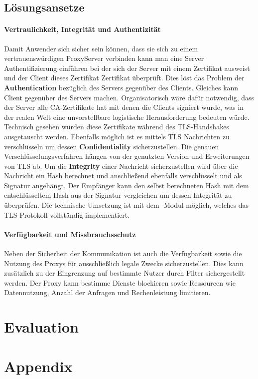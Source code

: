 \documentclass[12pt, a4paper]{scrartcl}
\begin{document}
\subsection{Lösungsansetze}
\paragraph{Vertraulichkeit, Integrität und Authentizität}
Damit Anwender sich sicher sein können, dass sie sich zu einem vertrauenswürdigen ProxyServer verbinden kann man eine Server Authentifizierung einführen bei der sich der Server mit einem Zertifikat ausweist und der Client dieses Zertifikat Zertifikat überprüft. Dies löst das Problem der \textbf{Authentication} bezüglich des Servers gegenüber des Clients. Gleiches kann Client gegenüber des Servers machen. Organisatorisch wäre dafür notwendig, dass der Server alle CA-Zertifikate hat mit denen die Clients signiert wurde, was in der realen Welt eine unvorstellbare logistische Herausforderung bedeuten würde.\newline
Technisch gesehen würden diese Zertifikate während des \ac{TLS}-Handshakes ausgetauscht werden. Ebenfalls möglich ist es mittels \ac{TLS} Nachrichten zu verschlüsseln um dessen \textbf{Confidentiality} sicherzustellen. Die genauen Verschlüsselungsverfahren hängen von der genutzten Version und Erweiterungen von \ac{TLS} ab.\newline
Um die \textbf{Integrity} einer Nachricht sicherzustellen wird über die Nachricht ein Hash berechnet und anschließend ebenfalls verschlüsselt und als Signatur angehängt. Der Empfänger kann den selbst berechneten Hash mit dem entschlüsseltem Hash aus der Signatur vergleichen um dessen Integrität zu überprüfen.\newline
Die technische Umsetzung ist mit dem -Modul möglich, welches das \ac{TLS}-Protokoll vollständig implementiert.
\paragraph{Verfügbarkeit und Missbrauchsschutz}
Neben der Sicherheit der Kommunikation ist auch die Verfügbarkeit sowie die Nutzung des Proxys für ausschließlich legale Zwecke sicherzustellen. Dies kann zusätzlich zu der Eingrenzung auf bestimmte Nutzer durch Filter sichergestellt werden. Der Proxy kann bestimme Dienste blockieren sowie Ressourcen wie Datennutzung, Anzahl der Anfragen und Rechenleistung limitieren.
\section{Evaluation}


\newpage
\renewcommand{\thesubsection}{\Alph{subsection}}
\setcounter{page}{\value{lastroman}}
\section*{Appendix}

\end{document}

